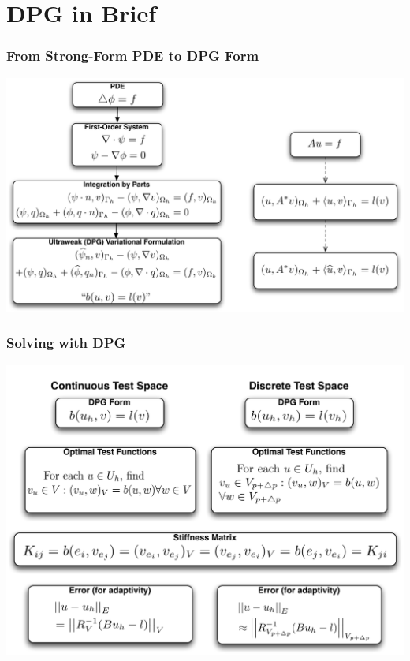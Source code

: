 \documentclass[mathserif]{beamer}
\begin{document}
\section{DPG in Brief} %
\begin{frame}                                                                                                                                                                          
\frametitle{From Strong-Form PDE to DPG Form}
\begin{center}
\includegraphics[width=\linewidth]{../figures/DPGFormCartoon}\\
\end{center}
\end{frame}              
\begin{frame}                                                                                                                                                                          
\frametitle{Solving with DPG}
\begin{center} 
\includegraphics[width=0.9\linewidth]{../figures/DPGSolveCartoonNew}\\
\end{center}
\end{frame}
\end{document}
